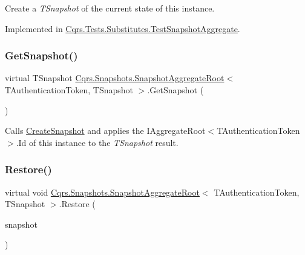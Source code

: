 Create a {\itshape T\+Snapshot}  of the current state of this instance. 



Implemented in \hyperlink{classCqrs_1_1Tests_1_1Substitutes_1_1TestSnapshotAggregate_a423bba964aa7fe1f8e89fbb153d7db37_a423bba964aa7fe1f8e89fbb153d7db37}{Cqrs.\+Tests.\+Substitutes.\+Test\+Snapshot\+Aggregate}.

\mbox{\label{classCqrs_1_1Snapshots_1_1SnapshotAggregateRoot_a30ec8fe3a09fec8238c5921c629a5ac1_a30ec8fe3a09fec8238c5921c629a5ac1}} 
\subsubsection{\texorpdfstring{Get\+Snapshot()}{GetSnapshot()}}
{\footnotesize\ttfamily virtual T\+Snapshot \hyperlink{classCqrs_1_1Snapshots_1_1SnapshotAggregateRoot}{Cqrs.\+Snapshots.\+Snapshot\+Aggregate\+Root}$<$ T\+Authentication\+Token, T\+Snapshot $>$.Get\+Snapshot (\begin{DoxyParamCaption}{ }\end{DoxyParamCaption})\hspace{0.3cm}{\ttfamily [virtual]}}



Calls \hyperlink{classCqrs_1_1Snapshots_1_1SnapshotAggregateRoot_a2d8cd57c7b6c2696d286c6dc5e9f0479_a2d8cd57c7b6c2696d286c6dc5e9f0479}{Create\+Snapshot} and applies the I\+Aggregate\+Root$<$\+T\+Authentication\+Token$>$.\+Id of this instance to the {\itshape T\+Snapshot}  result. 

\mbox{\label{classCqrs_1_1Snapshots_1_1SnapshotAggregateRoot_a0b39f2941c828d987c84dc6cbb0a02be_a0b39f2941c828d987c84dc6cbb0a02be}} 
\subsubsection{\texorpdfstring{Restore()}{Restore()}}
{\footnotesize\ttfamily virtual void \hyperlink{classCqrs_1_1Snapshots_1_1SnapshotAggregateRoot}{Cqrs.\+Snapshots.\+Snapshot\+Aggregate\+Root}$<$ T\+Authentication\+Token, T\+Snapshot $>$.Restore (\begin{DoxyParamCaption}\item[{T\+Snapshot}]{snapshot }\end{DoxyParamCaption})\hspace{0.3cm}{\ttfamily [virtual]}}



